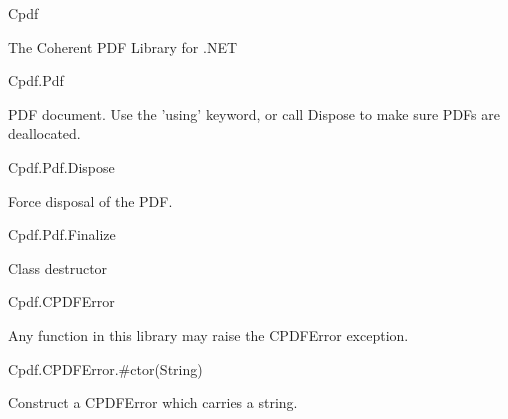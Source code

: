 Cpdf

The Coherent PDF Library for .NET

Cpdf.Pdf

PDF document. Use the 'using' keyword, or call Dispose to make sure PDFs are
deallocated.

Cpdf.Pdf.Dispose

Force disposal of the PDF.

Cpdf.Pdf.Finalize

Class destructor

Cpdf.CPDFError

Any function in this library may raise the CPDFError exception.

Cpdf.CPDFError.#ctor(String)

Construct a CPDFError which carries a string.
